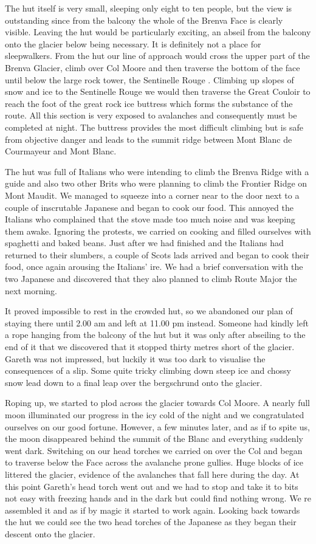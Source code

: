 \documentclass[a5paper,openany,font 10pt]{scrbook}
\begin{document}
The hut itself is very small, sleeping only eight to ten
people, but the view is outstanding since from the balcony the
whole of the Brenva Face is clearly visible. Leaving the hut
would be particularly exciting, an abseil from the balcony onto
the glacier below being necessary. It is definitely not a place
for sleepwalkers. From the hut our line of approach would cross
the upper part of the Brenva Glacier, climb over Col Moore and
then traverse the bottom of the face until below the large rock
tower, the  Sentinelle Rouge . Climbing up slopes of snow and ice
to the Sentinelle Rouge we would then traverse the Great Couloir
to reach the foot of the great rock ice buttress which forms the
substance of the route. All this section is very exposed to
avalanches and consequently must be completed at night. The
buttress provides the most difficult climbing but is safe from
objective danger and leads to the summit ridge between Mont Blanc
de Courmayeur and Mont Blanc.

The hut was full of Italians who were intending to climb the
 Brenva Ridge  with a guide and also two other Brits who were
planning to climb the  Frontier Ridge  on Mont Maudit. We managed
to squeeze into a corner near to the door next to a couple of
inscrutable Japanese and began to cook our food. This annoyed the
Italians who complained that the stove made too much noise and
was keeping them awake. Ignoring the protests, we carried on
cooking and filled ourselves with spaghetti and baked beans. Just
after we had finished and the Italians had returned to their
slumbers, a couple of Scots lads arrived and began to cook their
food, once again arousing the Italians' ire. We had a brief
conversation with the two Japanese and discovered that they also
planned to climb  Route Major  the next morning.

It proved impossible to rest in the crowded hut, so we
abandoned our plan of staying there until 2.00 am and left at
11.00 pm instead. Someone had kindly left a rope hanging from the
balcony of the hut but it was only after abseiling to the end of
it that we discovered that it stopped thirty metres short of the
glacier. Gareth was not impressed, but luckily it was too dark to
visualise the consequences of a slip. Some quite tricky climbing
down steep ice and chossy snow lead down to a final leap over the
bergschrund onto the glacier.

Roping up, we started to plod across the glacier towards Col
Moore. A nearly full moon illuminated our progress in the icy
cold of the night and we congratulated ourselves on our good
fortune. However, a few minutes later, and as if to spite us, the
moon disappeared behind the summit of the Blanc and everything
suddenly went dark. Switching on our head torches we carried on
over the Col and began to traverse below the Face across the
avalanche prone gullies. Huge blocks of ice littered the glacier,
evidence of the avalanches that fall here during the day. At this
point Gareth's head torch went out and we had to stop and take it
to bits  not easy with freezing hands and in the dark  but could
find nothing wrong. We re assembled it and as if by magic it
started to work again. Looking back towards the hut we could see
the two head torches of the Japanese as they began their descent
onto the glacier.
\end{document}
